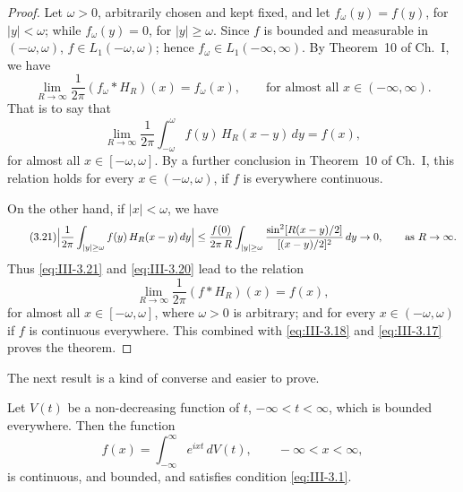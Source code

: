 \begin{proof}
Let $\omega>0$, arbitrarily chosen and kept fixed, and let $f_{\omega}(y)=f(y)$, for $|y|<\omega$; while $f_{\omega}(y)=0$, for $|y|\ge\omega$. Since $f$ is bounded and measurable in $(-\omega,\omega)$, $f\in L_{1}(-\omega,\omega)$; hence $f_{\omega}\in L_{1}(-\infty,\infty)$. By Theorem~10 of Ch.~I, we have
\[
\lim_{R\to\infty}\frac{1}{2\pi}(f_{\omega}*H_{R})(x)=f_{\omega}(x),\qquad\text{for almost all }x\in(-\infty,\infty).
\]
That is to say that
\begin{equation}\tag{3.20}\label{eq:III-3.20}
\lim_{R\to\infty}\frac{1}{2\pi}\int_{-\omega}^{\omega}f(y)\,H_{R}(x-y)\,dy=f(x),
\end{equation}
for almost all $x\in[-\omega,\omega]$. By a further conclusion in Theorem~10 of Ch.~I, this relation holds for every $x\in(-\omega,\omega)$, if $f$ is everywhere continuous.

On the other hand, if $|x|<\omega$, we have
\begin{equation}\tag{3.21}\label{eq:III-3.21}
\Bigl|\frac{1}{2\pi}\int_{|y|\ge\omega}f(y)\,H_{R}(x-y)\,dy\Bigr|
\le\frac{f(0)}{2\pi\,R}\int_{|y|\ge\omega}\frac{\sin^{2}[R(x-y)/2]}{[(x-y)/2]^{2}}\,dy\to0,
\qquad\text{as }R\to\infty.
\end{equation}
Thus \eqref{eq:III-3.21} and \eqref{eq:III-3.20} lead to the relation
\begin{equation}\tag{3.19}\label{eq:III-3.19b}
\lim_{R\to\infty}\frac{1}{2\pi}(f*H_{R})(x)=f(x),
\end{equation}
for almost all $x\in[-\omega,\omega]$, where $\omega>0$ is arbitrary; and for every $x\in(-\omega,\omega)$ if $f$ is continuous everywhere. This combined with \eqref{eq:III-3.18} and \eqref{eq:III-3.17} proves the theorem.
\end{proof}

The next result is a kind of converse and easier to prove.

\begin{theorem}[Bochner]\label{thm:III-6}
Let $V(t)$ be a non-decreasing function of $t$, $-\infty<t<\infty$, which is bounded everywhere. Then the function
\begin{equation}\tag{3.22}\label{eq:III-3.22}
f(x)=\int_{-\infty}^{\infty}e^{ixt}\,dV(t),\qquad-\infty<x<\infty,
\end{equation}
is continuous, and bounded, and satisfies condition \eqref{eq:III-3.1}.
\end{theorem}


